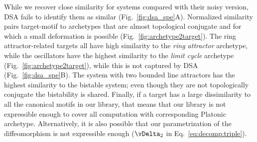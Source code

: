 \documentclass{article}
\theoremstyle{definition} \newtheorem{definition}{Definition}  \newtheorem{example}{Example}
\theoremstyle{remark} \newtheorem{remark}{Remark}
\newcounter{ct}
\begin{document}
While we recover close similarity for systems compared with their noisy version, DSA fails to identify them as similar (Fig.~\ref{fig:dsa_spe}A).
Normalized similarity pairs target-motif to archetypes that are almost topological conjugate and for which a small deformation is possible (Fig.~\ref{fig:archetype2target}). 
The ring attractor-related targets all have high similarity to the \emph{ring attractor} archetype, while the oscillators have the highest similarity to the \emph{limit cycle} archetype (Fig.~\ref{fig:archetype2target}), while this is not captured by DSA (Fig.~\ref{fig:dsa_spe}B). 
The system with two bounded line attractors has the highest similarity to the bistable system; even though they are not topologically conjugate the bistability is shared.
Finally, if a target has a large dissimilarity to all the canonical motifs in our library, that means that our library is not expressible enough to cover all computation with corresponding Platonic archetype.
Alternatively, it is also possible that our parametrization of the diffeomorphism is not expressible enough ($\vDelta_2$ in Eq.~\ref{eq:decomp:triple}).





\end{document}
